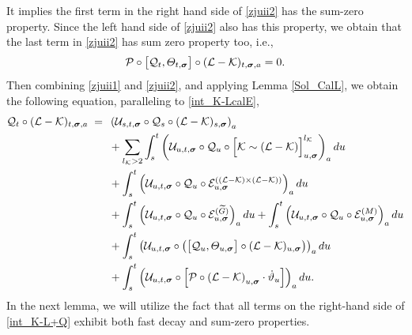 \documentclass[10pt,reqno]{article}
\theoremstyle{plain} %
\theoremstyle{remark}
\numberwithin{equation}{section}
\begin{document}
It implies the first term in the right hand side of \eqref{zjuii2} has the sum-zero property. Since the left hand side of \eqref{zjuii2} also has this property, we obtain that the last term in \eqref{zjuii2} has sum zero property too, i.e., 
\begin{align}\label{pqthlk}
   {\cal P}\circ \big[{\cal Q}_t , \varTheta_{t,\boldsymbol{\sigma}} \big]\circ (\mathcal{L} - \mathcal{K}) _{t, \boldsymbol{\sigma}, \textbf{a}}=0. 
\end{align}
Then combining \eqref{zjuii1} and \eqref{zjuii2}, and applying Lemma \ref{Sol_CalL}, we obtain the following equation, paralleling to \eqref{int_K-LcalE}, 
 \begin{align}\label{int_K-L+Q}
  {\cal Q}_t\circ   (\mathcal{L} - \mathcal{K})_{t, \boldsymbol{\sigma}, \textbf{a}} \;=\; \; &
    \left(\mathcal{U}_{s, t, \boldsymbol{\sigma}} \circ  {\cal Q}_s\circ (\mathcal{L} - \mathcal{K})_{s, \boldsymbol{\sigma}}\right)_{\textbf{a}} \nonumber \\
    &+ \sum_{l_\mathcal{K} > 2} \int_{s}^t \left(\mathcal{U}_{u, t, \boldsymbol{\sigma}} \circ  {\cal Q}_u\circ \Big[\mathcal{K} \sim (\mathcal{L} - \mathcal{K})\Big]^{l_\mathcal{K}}_{u, \boldsymbol{\sigma}}\right)_{\textbf{a}} du \nonumber \\
    &+ \int_{s}^t \left(\mathcal{U}_{u, t, \boldsymbol{\sigma}} \circ  {\cal Q}_u\circ \mathcal{E}^{((\mathcal{L} - \mathcal{K}) \times (\mathcal{L} - \mathcal{K}))}_{u, \boldsymbol{\sigma}}\right)_{\textbf{a}} du \nonumber \\
    &+ \int_{s}^t \left(\mathcal{U}_{u, t, \boldsymbol{\sigma}} \circ  {\cal Q}_u\circ \mathcal{E}^{(\widetilde{G})}_{u, \boldsymbol{\sigma}}\right)_{\textbf{a}} du + \int_{s}^t \left(\mathcal{U}_{u, t, \boldsymbol{\sigma}} \circ  {\cal Q}_u\circ \mathcal{E}^{(M)}_{u, \boldsymbol{\sigma}}\right)_{\textbf{a}} du
    \nonumber \\
     &+ \int_{s}^t 
     \left(\mathcal{U}_{u, t, \boldsymbol{\sigma}} 
     \circ \left( \big[{\cal Q}_u , \varTheta_{u,\boldsymbol{\sigma}} \big]\circ (\mathcal{L} - \mathcal{K}) _{u, \boldsymbol{\sigma} }\right) \right)_{\textbf{a}} du
        \\\nonumber
    &+ \int_{s}^t 
     \left(\mathcal{U}_{u, t, \boldsymbol{\sigma}} 
     \circ \left[ {\cal P} \circ
      \left(\mathcal{L} - \mathcal{K}\right)_{u, \boldsymbol{\sigma}}
        \cdot \dot \vartheta_{u } \right]\right)_{\textbf{a}} du.
\end{align}
In the next lemma, we will utilize the fact that all terms on the right-hand side of \eqref{int_K-L+Q} exhibit both fast decay and sum-zero properties.
\end{document}

